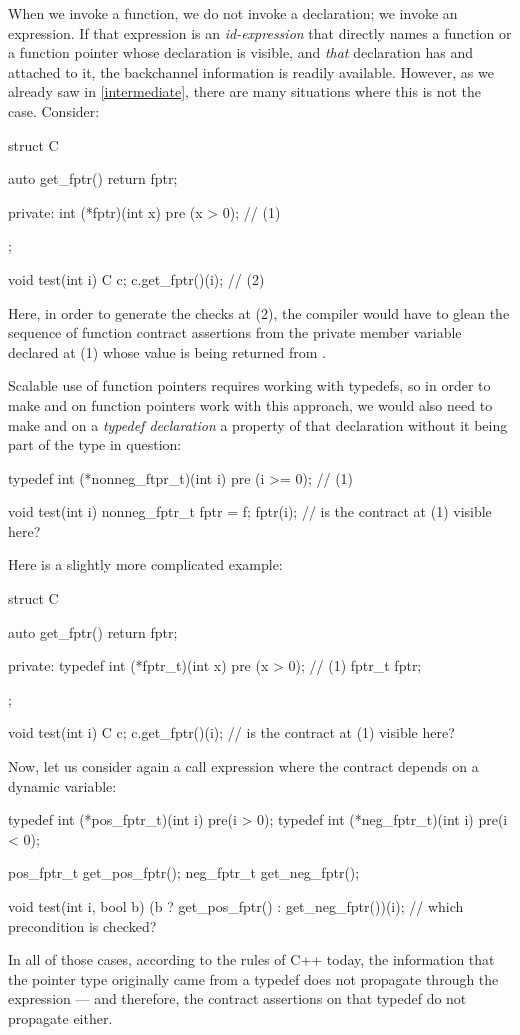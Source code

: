 When we invoke a function, we do not invoke a declaration; we invoke an expression. If that expression is an \emph{id-expression} that directly names a function or a function pointer whose declaration is visible, and \emph{that} declaration has  and  attached to it, the backchannel information is readily available. However, as we already saw in \ref{intermediate}, there are many situations where this is not the case. Consider:
\begin{codeblock}
struct C {
  auto get_fptr() { return fptr; }
  
private:
  int (*fptr)(int x) pre (x > 0);  // (1)
};

void test(int i) {
  C c;
  c.get_fptr()(i);  // (2)
}
\end{codeblock}
Here, in order to generate the checks at (2), the compiler would have to glean the sequence of function contract assertions from the private member variable declared at (1) whose value is being returned from . 

Scalable use of function pointers requires working with typedefs, so in order to make  and  on function pointers work with this approach, we would also need to make  and  on a \emph{typedef declaration} a property of that declaration without it being part of the type in question:
\begin{codeblock}
typedef int (*nonneg_ftpr_t)(int i) pre (i >= 0);  // (1)

void test(int i) {
  nonneg_fptr_t fptr = f;
  fptr(i);  // is the contract at (1) visible here?
}
\end{codeblock}
Here is a slightly more complicated example:
\begin{codeblock}
struct C {
  auto get_fptr() { return fptr; }
  
private:
  typedef int (*fptr_t)(int x) pre (x > 0);  // (1)
  fptr_t fptr;
};

void test(int i) {
  C c;
  c.get_fptr()(i);  // is the contract at (1) visible here?
}
\end{codeblock}
Now, let us consider again a call expression where the contract depends on a dynamic variable:
\begin{codeblock}
typedef int (*pos_fptr_t)(int i) pre(i > 0);
typedef int (*neg_fptr_t)(int i) pre(i < 0);

pos_fptr_t get_pos_fptr();
neg_fptr_t get_neg_fptr();

void test(int i, bool b) {
  (b ? get_pos_fptr() : get_neg_fptr())(i);  // which precondition is checked?
}
\end{codeblock}
In all of those cases, according to the rules of C++ today, the information that the pointer type originally came from a typedef does not propagate through the expression --- and therefore, the contract assertions on that typedef do not propagate either.

